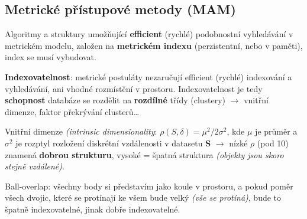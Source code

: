 \subsection{Metrické přístupové metody (MAM)}

Algoritmy a struktury umožňující \textbf{efficient} (rychlé) podobnostní vyhledávání v metrickém modelu, založen na \textbf{metrickém indexu} (perzistentní, nebo v paměti), index se musí vybudovat.

\textbf{Indexovatelnost}: metrické postuláty nezaručují efficient (rychlé) indexování a vyhledávání, ani vhodné rozmístění v prostoru. Indexovatelnost je tedy \textbf{schopnost} databáze se rozdělit na \textbf{rozdílné} třídy (clustery) $\to$ vnitřní dimenze, faktor překrývání clusterů\ldots

Vnitřní dimenze \textit{(intrinsic dimensionality}: $\rho(S,\delta) = \mu^2 / 2\sigma^2$, kde $\mu$ je průměr a $\sigma^2$ je rozptyl rozložení diskrétní vzdálenosti v datasetu \textbf{S} $\to$ nízké $\rho$ (pod 10) znamená \textbf{dobrou strukturu}, vysoké = špatná struktura \textit{(objekty jsou skoro stejně vzdálené)}.

Ball-overlap: všechny body si představím jako koule v prostoru, a pokud poměr všech dvojic, které se protínají ke všem bude velký \textit{(vše se protíná)}, bude to špatně indexovatelné, jinak dobře indexovatelné.
